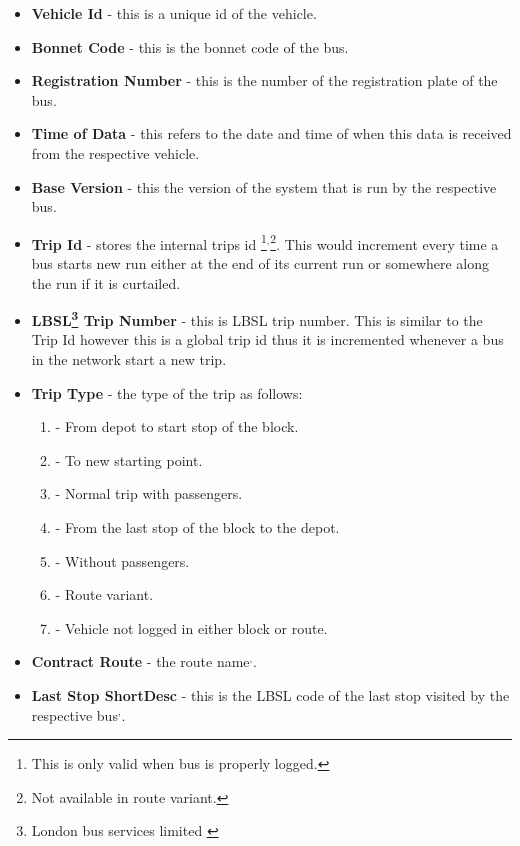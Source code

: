 \begin{itemize}
	\item \textbf{Vehicle Id} - this is a unique id of the vehicle.
	\item \textbf{Bonnet Code} - this is the bonnet code of the bus.
	\item \textbf{Registration Number} - this is the number of the registration plate of the bus. 
	\item \textbf{Time of Data} -  this refers to the date and time of when this data is received from the respective vehicle.
	\item \textbf{Base Version} - this the version of the system that is run by the respective bus.
	\item \textbf{Trip Id} - stores the internal trips id
	\footnote{\label{loggedProperly}This is only valid when bus is properly logged.}$^{,}$\footnote{\label{routeVariant}Not available in route variant.}. This would increment every time a bus starts new run either at the end of its current run or somewhere along the run if it is curtailed.
	\item \textbf{LBSL\footnote{London bus services limited \cite{lbsl}} Trip Number} - this is LBSL trip number\footnotemark[\ref{loggedProperly}]. This is similar to the Trip Id however this is a global trip id thus it is incremented whenever a bus in the network start a new trip.
	\item \textbf{Trip Type} - the type of the trip as follows:
\begin{enumerate}
\item - From depot to start stop of the block.
\item - To new starting point.
\item - Normal trip with passengers.
\item - From the last stop of the block to the depot.
\item - Without passengers.
\item - Route variant.
\item - Vehicle not logged in either block or route.
\end{enumerate}
	\item \textbf{Contract Route} - the route name\footnotemark[\ref{loggedProperly}]$^{,}$\footnotemark[\ref{routeVariant}].
	\item \textbf{Last Stop ShortDesc} - this is the LBSL code of the last stop visited by the respective bus\footnotemark[\ref{loggedProperly}]$^{,}$\footnotemark[\ref{routeVariant}].

\end{itemize}
